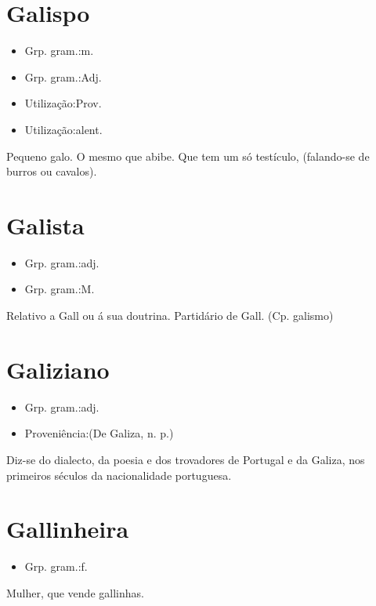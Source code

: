 \section{Galispo}
\begin{itemize}
\item {Grp. gram.:m.}
\end{itemize}
\begin{itemize}
\item {Grp. gram.:Adj.}
\end{itemize}
\begin{itemize}
\item {Utilização:Prov.}
\end{itemize}
\begin{itemize}
\item {Utilização:alent.}
\end{itemize}
Pequeno galo.
O mesmo que \textunderscore abibe\textunderscore .
Que tem um só testículo, (falando-se de burros ou cavalos).
\section{Galista}
\begin{itemize}
\item {Grp. gram.:adj.}
\end{itemize}
\begin{itemize}
\item {Grp. gram.:M.}
\end{itemize}
Relativo a Gall ou á sua doutrina.
Partidário de Gall.
(Cp. \textunderscore galismo\textunderscore )
\section{Galiziano}
\begin{itemize}
\item {Grp. gram.:adj.}
\end{itemize}
\begin{itemize}
\item {Proveniência:(De \textunderscore Galiza\textunderscore , n. p.)}
\end{itemize}
Diz-se do dialecto, da poesia e dos trovadores de Portugal e da Galiza, nos primeiros séculos da nacionalidade portuguesa.
\section{Gallinheira}
\begin{itemize}
\item {Grp. gram.:f.}
\end{itemize}
Mulher, que vende gallinhas.
